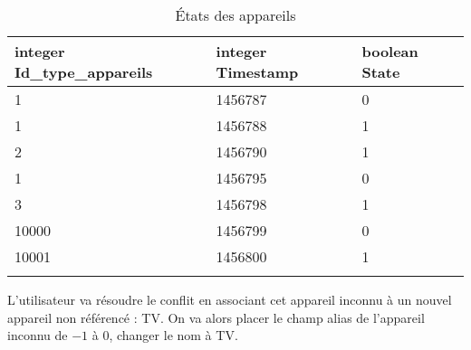 \documentclass[10pt,a4paper]{article}
\begin{document}
\begin{table}[h!]
\centering
    \begin{tabular}{|l|l|l|}
    \hline
    \rowcolor[HTML]{EFEFEF} 
    integer Id\_type\_appareils & integer Timestamp & boolean State \\ \hline
    1       & 1456787           & 0             \\ \hline
    1       & 1456788           & 1             \\ \hline
    2       & 1456790           & 1             \\ \hline
    1       & 1456795           & 0             \\ \hline
    3       & 1456798           & 1             \\ \hline
    10000       & 1456799          & 0             \\ \hline
    10001       & 1456800           & 1             \\ \hline
                 &                   &              
    \end{tabular}
    \caption{États des appareils}
\end{table} 
L'utilisateur va résoudre le conflit en associant cet appareil inconnu à un nouvel appareil non référencé : TV. On va alors placer le champ alias de l'appareil inconnu de $-1$ à $0$, changer le nom à TV.  
\end{document}
